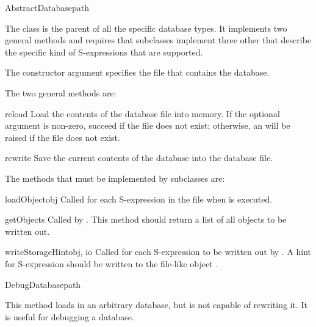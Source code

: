 \documentclass{howto}
\begin{document}
\begin{classdesc}{AbstractDatabase}{path}

The  class is the parent of all the specific
database types.  It implements two general methods and requires that
subclasses implement three other that describe the specific kind of
S-expressions that are supported.

The constructor argument  specifies the file that contains
the database.

The two general methods are:

\begin{methoddesc}{reload}{}
Load the contents of the database file into memory.  If the optional
 argument is non-zero, succeed if the file does not exist;
otherwise, an  will be raised if the file does not
exist.
\end{methoddesc}

\begin{methoddesc}{rewrite}{}
Save the current contents of the database into the database file.
\end{methoddesc}

The methods that must be implemented by subclasses are:

\begin{methoddesc}{loadObject}{obj}
Called for each S-expression in the file when  is
executed.
\end{methoddesc}

\begin{methoddesc}{getObjects}{}
Called by .  This method should return a list of all
objects to be written out.
\end{methoddesc}

\begin{methoddesc}{writeStorageHint}{obj, io}
Called for each S-expression to be written out by .
A hint for S-expression  should be written to the file-like
object .
\end{methoddesc}

\end{classdesc}

\begin{classdesc}{DebugDatabase}{path}

This method loads in an arbitrary database, but is not capable of
rewriting it.  It is useful for debugging a database.

\end{classdesc}
\end{document}
